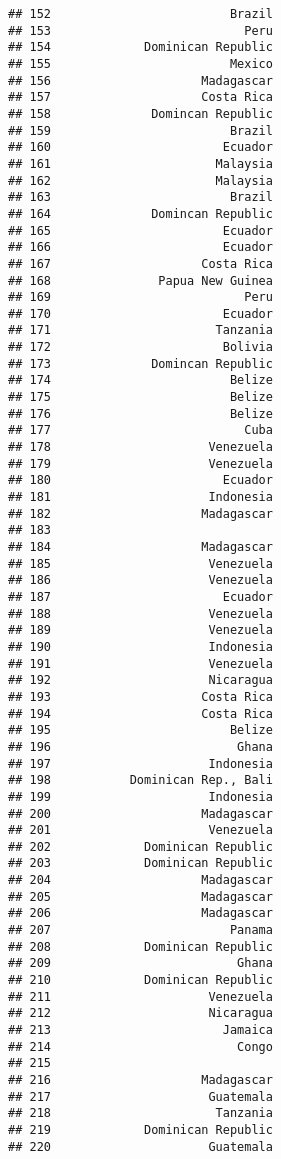 \documentclass[
]{article}
\begin{document}
\begin{verbatim}
## 152                         Brazil
## 153                           Peru
## 154             Dominican Republic
## 155                         Mexico
## 156                     Madagascar
## 157                     Costa Rica
## 158              Domincan Republic
## 159                         Brazil
## 160                        Ecuador
## 161                       Malaysia
## 162                       Malaysia
## 163                         Brazil
## 164              Domincan Republic
## 165                        Ecuador
## 166                        Ecuador
## 167                     Costa Rica
## 168               Papua New Guinea
## 169                           Peru
## 170                        Ecuador
## 171                       Tanzania
## 172                        Bolivia
## 173              Domincan Republic
## 174                         Belize
## 175                         Belize
## 176                         Belize
## 177                           Cuba
## 178                      Venezuela
## 179                      Venezuela
## 180                        Ecuador
## 181                      Indonesia
## 182                     Madagascar
## 183                               
## 184                     Madagascar
## 185                      Venezuela
## 186                      Venezuela
## 187                        Ecuador
## 188                      Venezuela
## 189                      Venezuela
## 190                      Indonesia
## 191                      Venezuela
## 192                      Nicaragua
## 193                     Costa Rica
## 194                     Costa Rica
## 195                         Belize
## 196                          Ghana
## 197                      Indonesia
## 198           Dominican Rep., Bali
## 199                      Indonesia
## 200                     Madagascar
## 201                      Venezuela
## 202             Dominican Republic
## 203             Dominican Republic
## 204                     Madagascar
## 205                     Madagascar
## 206                     Madagascar
## 207                         Panama
## 208             Dominican Republic
## 209                          Ghana
## 210             Dominican Republic
## 211                      Venezuela
## 212                      Nicaragua
## 213                        Jamaica
## 214                          Congo
## 215                               
## 216                     Madagascar
## 217                      Guatemala
## 218                       Tanzania
## 219             Dominican Republic
## 220                      Guatemala

\end{verbatim}
\end{document}

